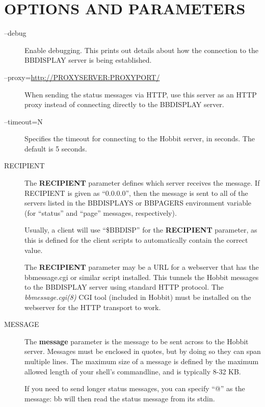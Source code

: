 \section{OPTIONS AND PARAMETERS}
\begin{description}

\item[--debug] Enable debugging. This prints out details about how the
  connection to the BBDISPLAY server is being established. 

\item[--proxy=\url{http://PROXYSERVER:PROXYPORT/}] When sending the
  status messages via HTTP, use this server as an HTTP proxy instead
  of connecting directly to the BBDISPLAY server. 

\item[--timeout=N] Specifies the timeout for connecting to the Hobbit
  server, in seconds. The default is 5 seconds. 

\item[RECIPIENT] The \textbf{RECIPIENT}
 parameter defines which server receives the message. If RECIPIENT is
 given as ``0.0.0.0'', then the message is sent to all of the servers
 listed in the BBDISPLAYS or BBPAGERS environment variable (for
 ``status'' and ``page'' messages, respectively). 

Usually, a client will use ``\$BBDISP'' for the \textbf{RECIPIENT}
parameter, as this is defined for the client scripts to automatically
contain the correct value. 


The \textbf{RECIPIENT} parameter may be a URL for a webserver that
has the bbmessage.cgi or similar script installed. This tunnels the
Hobbit messages to the BBDISPLAY server using standard HTTP
protocol. The \emph{bbmessage.cgi(8)} CGI tool (included in Hobbit)
must be installed on the webserver for the HTTP transport to work.  


\item[MESSAGE] The \textbf{message} parameter is the message to be
  sent across to the Hobbit server. Messages must be enclosed in
  quotes, but by doing so they can span multiple lines. The maximum
  size of a message is defined by the maximum allowed length of your
  shell's commandline, and is typically  8-32 KB. 

If you need to send longer status messages, you can specify ``@'' as
the message: bb will then read the status message from its stdin. 


\end{description}

